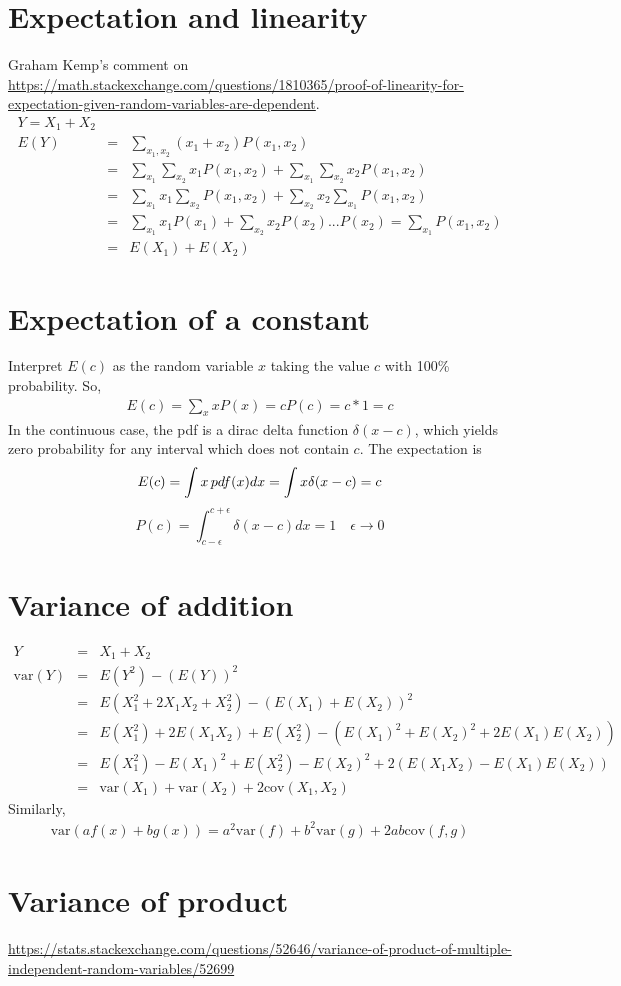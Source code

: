\documentclass{article}
\newcommand{\beq}{\begin{equation}}
\newcommand{\eeq}{\end{equation}}
\newcommand{\ber}{\begin{eqnarray}}
\newcommand{\eer}{\end{eqnarray}}
\begin{document}
\section{Expectation and linearity}
Graham Kemp's comment on \url{https://math.stackexchange.com/questions/1810365/proof-of-linearity-for-expectation-given-random-variables-are-dependent}.
\ber
Y = X_1 + X_2 \\
E(Y) &=& \sum_{x_1,x_2}(x_1 + x_2)P(x_1,x_2) \\
&=& \sum_{x_1}\sum_{x_2}x_1P(x_1,x_2) + \sum_{x_1}\sum_{x_2}x_2P(x_1,x_2) \\
&=& \sum_{x_1}x_1\sum_{x_2}P(x_1,x_2)  + \sum_{x_2}x_2\sum_{x_1}P(x_1,x_2) \\
&=& \sum_{x_1}x_1P(x_1) + \sum_{x_2}x_2P(x_2) \text{...}P(x_2)=\sum_{x_1}P(x_1,x_2)\\
&=& E(X_1) + E(X_2)
\eer
%
%
%
\section{Expectation of a constant}
Interpret $E(c)$ as the random variable $x$ taking the value $c$ with 100\% probability. So,
\ber
E(c) = \sum_{x}xP(x) = cP(c) = c*1 = c
\eer
In the continuous case, the pdf is a dirac delta function $\delta(x-c)$, which yields zero probability for any interval which does not contain $c$. The expectation is
\beq
E(c) = \int x\, pdf(x) dx = \int x \delta(x-c) = c \\
\eeq
{}
\beq
P(c) = \int_{c-\epsilon}^{c+\epsilon}\delta(x-c) dx = 1  \quad \epsilon\rightarrow{0}
\eeq

\section{Variance of addition}
\ber
Y &=& X_1 + X_2 \\
\text{var}(Y) &=& E(Y^2) - (E(Y))^2\\
&=& E(X_1^2 + 2X_1X_2 + X_2^2) - (E(X_1) + E(X_2))^2 \\
&=& E(X_1^2) + 2E(X_1X_2) + E(X_2^2) - (E(X_1)^2 + E(X_2)^2 + 2E(X_1)E(X_2)) \\
&=& E(X_1^2) - E(X_1)^2 + E(X_2^2) - E(X_2)^2 +2(E(X_1X_2)-E(X_1)E(X_2)) \\
&=& \text{var}(X_1) + \text{var}(X_2) +2\text{cov}(X_1,X_2)
\eer
Similarly,
\ber
\text{var}(af(x)+bg(x)) = a^2\text{var}(f) + b^2\text{var}(g) +2ab\text{cov}(f,g) 
\eer
%
%
%
\section{Variance of product}
\url{https://stats.stackexchange.com/questions/52646/variance-of-product-of-multiple-independent-random-variables/52699}
%
%
%
\end{document}
